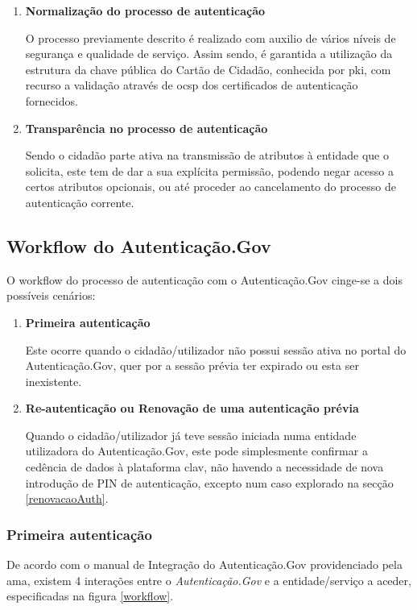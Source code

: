 \begin{enumerate}
    \item \textbf{Normalização do processo de autenticação}
    
    O processo previamente descrito é realizado com auxilio de vários níveis de segurança e qualidade de serviço. Assim sendo, é garantida a utilização da estrutura da chave pública do Cartão de Cidadão, conhecida por \gls{pki}, com recurso a validação através de \gls{ocsp} dos certificados de autenticação fornecidos.
    
    \item \textbf{Transparência no processo de autenticação}
    
    Sendo o cidadão parte ativa na transmissão de atributos à entidade que o solicita, este tem de dar a sua explícita permissão, podendo negar acesso a certos atributos opcionais, ou até proceder ao cancelamento do processo de autenticação corrente.
\end{enumerate}

\subsection{Workflow do Autenticação.Gov}

O workflow do processo de autenticação com o Autenticação.Gov cinge-se a dois possíveis cenários:

\begin{enumerate}
    \item \textbf{Primeira autenticação}
    
    Este ocorre quando o cidadão/utilizador não possui sessão ativa no portal do Autenticação.Gov, quer por a sessão prévia ter expirado ou esta ser inexistente.
    
    \item \textbf{Re-autenticação ou Renovação de uma autenticação prévia}
    
    Quando o cidadão/utilizador já teve sessão iniciada numa entidade utilizadora do Autenticação.Gov, este pode simplesmente confirmar a cedência de dados à plataforma \gls{clav}, não havendo a necessidade de nova introdução de PIN de autenticação, excepto num caso explorado na secção \ref{renovacaoAuth}.
\end{enumerate}

\subsubsection{Primeira autenticação}
De acordo com o manual de Integração do Autenticação.Gov\cite{manualAuthGov} providenciado pela \gls{ama}, existem 4 interações entre o \emph{Autenticação.Gov} e a entidade/serviço a aceder, especificadas na figura \ref{workflow}.

